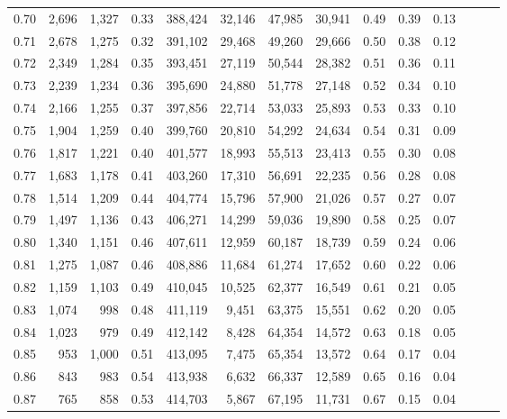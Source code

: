 \begin{tabular}{rrrrrrrrrrrrrr}
0.70 &   2,696 &  1,327 &  0.33 &  388,424 &   32,146 &  47,985 &  30,941 &  0.49 &  0.39 &      0.13 \\
0.71 &   2,678 &  1,275 &  0.32 &  391,102 &   29,468 &  49,260 &  29,666 &  0.50 &  0.38 &      0.12 \\
0.72 &   2,349 &  1,284 &  0.35 &  393,451 &   27,119 &  50,544 &  28,382 &  0.51 &  0.36 &      0.11 \\
0.73 &   2,239 &  1,234 &  0.36 &  395,690 &   24,880 &  51,778 &  27,148 &  0.52 &  0.34 &      0.10 \\
0.74 &   2,166 &  1,255 &  0.37 &  397,856 &   22,714 &  53,033 &  25,893 &  0.53 &  0.33 &      0.10 \\
0.75 &   1,904 &  1,259 &  0.40 &  399,760 &   20,810 &  54,292 &  24,634 &  0.54 &  0.31 &      0.09 \\
0.76 &   1,817 &  1,221 &  0.40 &  401,577 &   18,993 &  55,513 &  23,413 &  0.55 &  0.30 &      0.08 \\
0.77 &   1,683 &  1,178 &  0.41 &  403,260 &   17,310 &  56,691 &  22,235 &  0.56 &  0.28 &      0.08 \\
0.78 &   1,514 &  1,209 &  0.44 &  404,774 &   15,796 &  57,900 &  21,026 &  0.57 &  0.27 &      0.07 \\
0.79 &   1,497 &  1,136 &  0.43 &  406,271 &   14,299 &  59,036 &  19,890 &  0.58 &  0.25 &      0.07 \\
0.80 &   1,340 &  1,151 &  0.46 &  407,611 &   12,959 &  60,187 &  18,739 &  0.59 &  0.24 &      0.06 \\
0.81 &   1,275 &  1,087 &  0.46 &  408,886 &   11,684 &  61,274 &  17,652 &  0.60 &  0.22 &      0.06 \\
0.82 &   1,159 &  1,103 &  0.49 &  410,045 &   10,525 &  62,377 &  16,549 &  0.61 &  0.21 &      0.05 \\
0.83 &   1,074 &    998 &  0.48 &  411,119 &    9,451 &  63,375 &  15,551 &  0.62 &  0.20 &      0.05 \\
0.84 &   1,023 &    979 &  0.49 &  412,142 &    8,428 &  64,354 &  14,572 &  0.63 &  0.18 &      0.05 \\
0.85 &     953 &  1,000 &  0.51 &  413,095 &    7,475 &  65,354 &  13,572 &  0.64 &  0.17 &      0.04 \\
0.86 &     843 &    983 &  0.54 &  413,938 &    6,632 &  66,337 &  12,589 &  0.65 &  0.16 &      0.04 \\
0.87 &     765 &    858 &  0.53 &  414,703 &    5,867 &  67,195 &  11,731 &  0.67 &  0.15 &      0.04 \\

\end{tabular}

